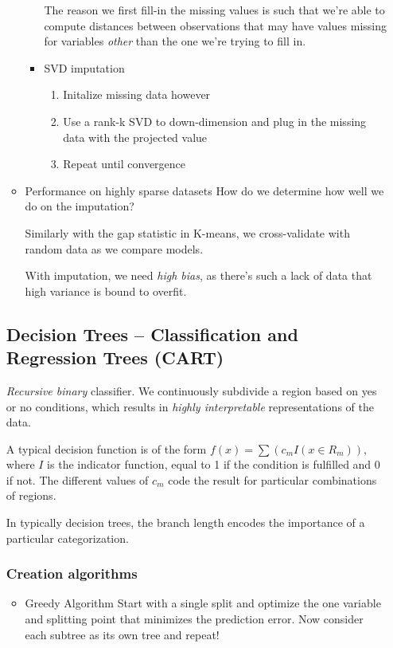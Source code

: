 \documentclass[11pt]{article}
\begin{document}
\begin{itemize}
\begin{itemize}
\begin{itemize}
The reason we first fill-in the missing values is such that we're able to compute distances between observations that may have values missing for variables \emph{other} than the one we're trying to fill in.
\item SVD imputation
\label{sec-4-3-1-2-4}
\begin{enumerate}
\item Initalize missing data however
\item Use a rank-k SVD to down-dimension and plug in the missing data with the projected value
\item Repeat until convergence
\end{enumerate}
\end{itemize}
\item Performance on highly sparse datasets
\label{sec-4-3-1-3}
How do we determine how well we do on the imputation?

Similarly with the gap statistic in K-means, we cross-validate with random data as we compare models.

With imputation, we need \emph{high bias}, as there's such a lack of data that high variance is bound to overfit.
\end{itemize}
\subsection{Decision Trees -- Classification and Regression Trees (CART)}
\label{sec-4-4}
\emph{Recursive binary} classifier. We continuously subdivide a region based on yes or no conditions, which results in \emph{highly interpretable} representations of the data.

A typical decision function is of the form $f(x) = \sum(c_m I(x\in R_m))$, where $I$ is the indicator function, equal to 1 if the condition is fulfilled and 0 if not. The different values of $c_m$ code the result for particular combinations of regions.

In typically decision trees, the branch length encodes the importance of a particular categorization.
\subsubsection*{Creation algorithms}
\label{sec-4-4-1}
\begin{itemize}
\item Greedy Algorithm
\label{sec-4-4-1-1}
Start with a single split and optimize the one variable and splitting point that minimizes the prediction error. Now consider each subtree as its own tree and repeat!


\end{itemize}
\end{itemize}
\end{document}
